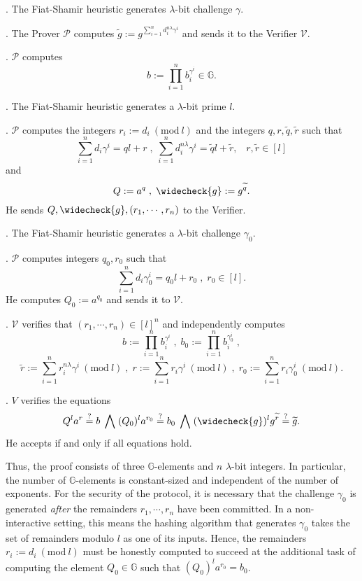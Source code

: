 \documentclass[11pt, lettersize, notitlepage, leqno, footskip=0.6cm]{article}
\newcommand{\slim}{\sum\limits}
\newcommand{\wti}{\widetilde}
\newcommand{\mc}{\mathcal}
\newcommand{\mb}{\mathbb}
\newcommand{\lam}{\lambda}
\newcommand{\lamb}{\lambda}
\newcommand{\weck}{\widecheck}
\newcommand{\mP}{\mc{P}}
\newcommand{\V}{\mc{V}}
\newcommand{\vs}{\vspace{-0.15cm}}
\newcommand{\noin}{\noindent}
\newcommand{\sta}{\stackrel{?}{=}}
\newcommand{\Mod}[1]{\ (\mathrm{mod}\ #1)}
\numberwithin{equation}{section}
\begin{document}
\begin{prf1} . The Fiat-Shamir heuristic generates $\lamb$-bit challenge $\gamma$.

\noin 2. The Prover $\mc{P}$ computes $\wti{g}:= g^{\sum\limits_{i=1}^n d_i^{n\lam}\gamma^i}$ and sends it to the Verifier $\mc{V}$.

. $\mc{P}$ computes \vs $$b:= \prod\limits_{i=1}^n b_i^{\gamma^i} \in \mb{G}.$$

\noin 4. The Fiat-Shamir heuristic generates a $\lam$-bit prime $l$. 

. $\mc{P}$ computes the integers $r_i:= d_i\Mod{l}$ and the integers $q, r,\wti{q},\wti{r}$ such that \vs $$\slim_{i=1}^n d_i\gamma^i = ql+r\;,\; \slim_{i=1}^n d_i^{n\lam}\gamma^i = \wti{q}l+\wti{r},\;\;\;r,\wti{r}\in[l]$$ and \vs $$Q:= a^q\;,\; \weck{g}:= g^{\wti{q}}.$$ He sends $Q, \weck{g}, (r_1,\cdots,r_n)$ to the Verifier.

\noin 6. The Fiat-Shamir heuristic generates a $\lam$-bit challenge $\gamma_0$.

\noin 7. $\mP$ computes integers $q_0, r_0$ such that \vs $$\slim_{i=1}^n d_i\gamma_0^i = q_0l+r_0\;,\;r_0\in[l] .$$ He computes $Q_0:= a^{q_0}$ and sends it to $\V.$

. $\mc{V}$ verifies that $(r_1,\cdots,r_n)\in [l]^n$ and independently computes \vs $$b := \prod\limits_{i=1}^n b_i^{\gamma^i}\;,\;b_0 := \prod\limits_{i=1}^n b_i^{\gamma_0^i}\;,$$ \vspace{-0.2cm} $$\wti{r}:= \slim_{i=1}^n r_i^{n\lam}\gamma^i\Mod{l}\;,\;r:= \slim_{i=1}^n r_i\gamma^i\Mod{l}\;,\;r_0:=\slim_{i=1}^n r_i\gamma_0^i\Mod{l}.$$ 

\noin 9. $V$ verifies the equations \vs $$Q^la^r\sta b\;\bigwedge\;(Q_0)^la^{r_0}\sta b_0\;\bigwedge\; (\weck{g})^lg^{\wti{r}}\sta\wti{g}.$$ He accepts if and only if all equations hold.\end{prf1}

Thus, the proof consists of three $\mb{G}$-elements and $n$ $\lam$-bit integers. In particular, the number of $\mb{G}$-elements is constant-sized and independent of the number of exponents. For the security of the protocol, it is necessary that the challenge $\gamma_0$ is generated \textit{after} the remainders $r_1,\cdots,r_n$ have been committed. In a non-interactive setting, this means the hashing algorithm that generates $\gamma_0$ takes the set of remainders modulo $l$ as one of its inputs. Hence, the remainders $r_i:= d_i\Mod{l}$ must be honestly computed to succeed at the additional task of computing the element $Q_0\in\mb{G}$ such that $(Q_0)^la^{r_0} = b_0$.
\end{document}
